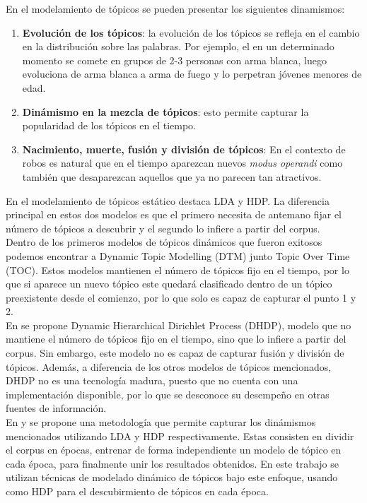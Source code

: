 \documentclass[letterpaper,12pt,oneside]{book} %
\begin{document}
En el modelamiento de tópicos se pueden presentar los siguientes dinamismos:
\begin{enumerate}
    \item \textbf{Evolución de los tópicos}: la evolución de los tópicos se refleja en el cambio en la distribución sobre las palabras. Por ejemplo, el  en un determinado momento se comete en grupos de 2-3 personas con arma blanca, luego evoluciona de arma blanca a arma de fuego y lo perpetran jóvenes menores de edad.
    \item \textbf{Dinámismo en la mezcla de tópicos}: esto permite capturar la popularidad de los tópicos en el tiempo.
    \item \textbf{Nacimiento, muerte, fusión y división de tópicos}: En el contexto de robos es natural que en el tiempo aparezcan nuevos \textit{modus operandi} como también que desaparezcan aquellos que ya no parecen tan atractivos.
\end{enumerate}

En el modelamiento de tópicos estático destaca LDA y HDP. La diferencia principal en estos dos modelos es que el primero necesita de antemano fijar el número de tópicos a descubrir y el segundo lo infiere a partir del corpus.\\

Dentro de los primeros modelos de tópicos dinámicos que fueron exitosos podemos encontrar a Dynamic Topic Modelling (DTM) junto Topic Over Time (TOC)\citep{wang2006topics}. Estos modelos mantienen el número de tópicos fijo en el tiempo, por lo que si aparece un nuevo tópico este quedará clasificado dentro de un tópico preexistente desde el comienzo, por lo que solo es capaz de capturar el punto 1 y 2.\\

En \citep{ahmed2012timeline} se propone Dynamic Hierarchical Dirichlet Process (DHDP), modelo que no mantiene el número de tópicos fijo en el tiempo, sino que lo infiere a partir del corpus. Sin embargo, este modelo no es capaz de capturar fusión y división de tópicos. Además, a diferencia de los otros modelos de tópicos mencionados, DHDP no es una tecnología madura, puesto que no cuenta con una implementación disponible, por lo que se desconoce su desempeño en otras fuentes de información.\\

En \citep{wilson2011tracking} y \citep{beykikhoshk2018discovering} se propone una metodología que permite capturar los dinámismos mencionados utilizando LDA y HDP respectivamente. Estas consisten en dividir el corpus en épocas, entrenar de forma independiente un modelo de tópico en cada época, para finalmente unir los resultados obtenidos. En este trabajo se utilizan técnicas de modelado dinámico de tópicos bajo este enfoque, usando como HDP para el descubirmiento de tópicos en cada época.
\end{document}
